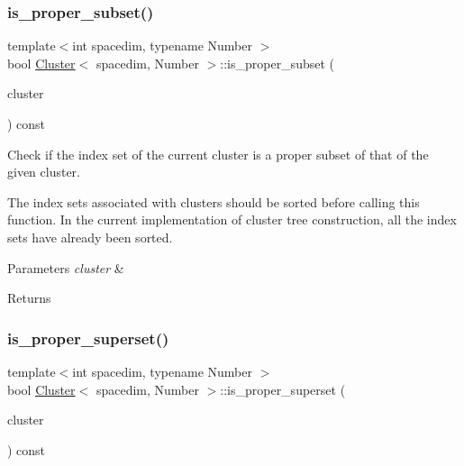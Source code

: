 \subsubsection{\texorpdfstring{is\+\_\+proper\+\_\+subset()}{is\_proper\_subset()}}
{\footnotesize\ttfamily template$<$int spacedim, typename Number $>$ \\
bool \hyperlink{classCluster}{Cluster}$<$ spacedim, Number $>$\+::is\+\_\+proper\+\_\+subset (\begin{DoxyParamCaption}\item[{const \hyperlink{classCluster}{Cluster}$<$ spacedim, Number $>$ \&}]{cluster }\end{DoxyParamCaption}) const}

Check if the index set of the current cluster is a proper subset of that of the given cluster.


\begin{DoxyDescription}
\item[Note ]The index sets associated with clusters should be sorted before calling this function. In the current implementation of cluster tree construction, all the index sets have already been sorted. 
\end{DoxyDescription}
\begin{DoxyParams}{Parameters}
{\em cluster} & \\
\hline
\end{DoxyParams}
\begin{DoxyReturn}{Returns}

\end{DoxyReturn}
\mbox{\label{classCluster_adfabc1eae12e962bae4af0a1854c3795}} 
\subsubsection{\texorpdfstring{is\+\_\+proper\+\_\+superset()}{is\_proper\_superset()}}
{\footnotesize\ttfamily template$<$int spacedim, typename Number $>$ \\
bool \hyperlink{classCluster}{Cluster}$<$ spacedim, Number $>$\+::is\+\_\+proper\+\_\+superset (\begin{DoxyParamCaption}\item[{const \hyperlink{classCluster}{Cluster}$<$ spacedim, Number $>$ \&}]{cluster }\end{DoxyParamCaption}) const}

